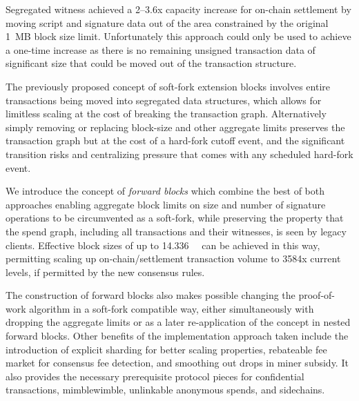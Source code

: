 Segregated witness achieved a \numrange{2}{3.6}x capacity increase for
on-chain settlement by moving script and signature data out of the
area constrained by the original \SI{1}{MB} block size limit.
Unfortunately this approach could only be used to achieve a one-time
increase as there is no remaining unsigned transaction data of
significant size that could be moved out of the transaction structure.

The previously proposed concept of soft-fork extension blocks involves
entire transactions being moved into segregated data structures, which
allows for limitless scaling at the cost of breaking the transaction
graph.  Alternatively simply removing or replacing block-size and
other aggregate limits preserves the transaction graph but at the cost
of a hard-fork cutoff event, and the significant transition risks and
centralizing pressure that comes with any scheduled hard-fork event.

We introduce the concept of \emph{forward blocks} which combine the
best of both approaches enabling aggregate block limits on size and
number of signature operations to be circumvented as a soft-fork,
while preserving the property that the spend graph, including all
transactions and their witnesses, is seen by legacy clients.
Effective block sizes of up to \SI{14.336}{\giga\weight} can be
achieved in this way, permitting scaling up on-chain/settlement
transaction volume to \num{3584}x current levels, if permitted by the
new consensus rules.

The construction of forward blocks also makes possible changing the
proof-of-work algorithm in a soft-fork compatible way, either
simultaneously with dropping the aggregate limits or as a later
re-application of the concept in nested forward blocks.  Other
benefits of the implementation approach taken include the introduction
of explicit sharding for better scaling properties, rebateable fee
market for consensus fee detection, and smoothing out drops in miner
subsidy.  It also provides the necessary prerequisite protocol pieces
for confidential transactions, mimblewimble, unlinkable anonymous
spends, and sidechains.
